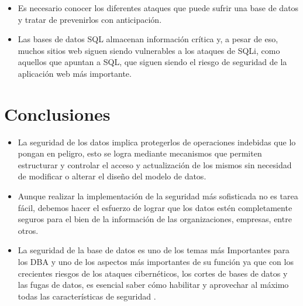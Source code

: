 \documentclass[%
 reprint,
 amsmath,amssymb,
 aps,
]{revtex4-1}
\begin{document}
\begin{itemize}
	\item Es necesario conocer los diferentes ataques que puede sufrir una base de datos y tratar de prevenirlos con anticipación. 
	\item Las bases de datos SQL almacenan información crítica y, a pesar de eso, muchos sitios web siguen siendo vulnerables a los ataques de SQLi, como aquellos que apuntan a SQL, que siguen siendo el riesgo de seguridad de la aplicación web más importante.
\end{itemize}
\section{Conclusiones}

\begin{itemize}
	\item La seguridad de los datos implica protegerlos de operaciones indebidas que lo pongan en peligro, esto se logra mediante mecanismos que permiten estructurar y controlar el acceso y actualización de los mismos sin necesidad de modificar o alterar el diseño del modelo de datos.
	\item Aunque realizar la implementación de la seguridad más sofisticada no es tarea fácil, debemos hacer el esfuerzo de lograr que los datos estén completamente seguros para el bien de la información de las organizaciones, empresas, entre otros.
           \item La seguridad de la base de datos es uno de los temas más Importantes para los DBA y uno de los aspectos más importantes de su función ya que  con los crecientes riesgos de los ataques cibernéticos, los cortes de bases de datos y las fugas de datos, es esencial saber cómo habilitar y aprovechar al máximo todas las características de seguridad .

\end{itemize}





\end{document}
